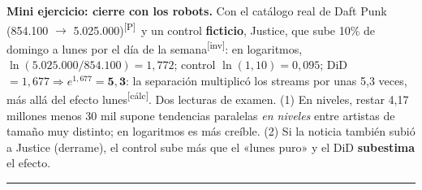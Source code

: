 \documentclass[10pt,a4paper]{article}
\newcommand{\Pre}{\textsuperscript{\textcolor{orange!80!black}{[P]}}}
\newcommand{\inv}{\textsuperscript{\textcolor{red!60!black}{[inv]}}}
\newcommand{\calc}{\textsuperscript{\textcolor{blue!60!black}{[cálc]}}}
\newcommand{\acto}[1]{\vspace{6pt}{\large\bfseries #1}\par\vspace{2pt}\hrule\vspace{4pt}}
\begin{document}
\textbf{Mini ejercicio: cierre con los robots.} Con el catálogo real de Daft Punk (854.100 $\to$ 5.025.000)\Pre\ y un control \textbf{ficticio}, Justice, que sube 10\% de domingo a lunes por el día de la semana\inv: en logaritmos, $\ln(5.025.000/854.100)=1{,}772$; control $\ln(1{,}10)=0{,}095$; DiD $=1{,}677\Rightarrow e^{1,677}=\mathbf{5{,}3}$: la separación multiplicó los streams por unas 5,3 veces, más allá del efecto lunes\calc. Dos lecturas de examen. (1) En niveles, restar 4,17 millones menos 30 mil supone tendencias paralelas \emph{en niveles} entre artistas de tamaño muy distinto; en logaritmos es más creíble. (2) Si la noticia también subió a Justice (derrame), el control sube más que el «lunes puro» y el DiD \textbf{subestima} el efecto.

\newpage
\acto{Tabla de recuerdo activo: tapa la columna derecha}
\small
\renewcommand{\arraystretch}{1.18}
\end{document}
